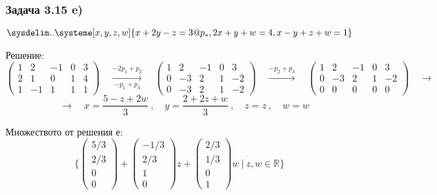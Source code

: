 \documentclass{subfiles}
\begin{document}
\subsubsection{Задача 3.15 e)}

\begin{equation*}
    \sysdelim..\systeme[x,y,z,w]{
        x + 2y - z = 3@p_{*},
        2x + y + w = 4,
        x - y + z + w = 1
    }
\end{equation*}

\noindent Решение:
\begin{equation*}
    \left(
        \begin{array}{ cccc|c }
            1 &  2 & -1 & 0 & 3 \\
            2 &  1 &  0 & 1 & 4 \\
            1 & -1 &  1 & 1 & 1
        \end{array}
    \right)
    \quad
    \overset{-2p_{1}+p_{2}}{\underset{-p_{1}+p_{3}}{\longrightarrow}}
    \quad
    \left(
        \begin{array}{ cccc|c }
            1 &  2 & -1 & 0 & 3 \\
            0 & -3 &  2 & 1 & -2 \\
            0 & -3 &  2 & 1 & -2
        \end{array}
    \right)
    \quad
    \overset{-p_{2}+p_{3}}{\longrightarrow}
    \quad
    \left(
        \begin{array}{ cccc|c }
            1 &  2 & -1 & 0 & 3 \\
            0 & -3 &  2 & 1 & -2 \\
            0 &  0 &  0 & 0 & 0
        \end{array}
    \right)
    \quad
    \longrightarrow
    \quad
\end{equation*}
\begin{equation*}
    \quad
    \longrightarrow
    \quad
    x = \frac{5 - z + 2w}{3}\ ,\quad
    y = \frac{2 + 2z + w}{3}\ ,\quad
    z = z\ ,\quad
    w = w
\end{equation*}

\noindent Множеството от решения е:
\begin{equation*}
    \{
        \left(\begin{array}{ c } 5/3 \\ 2/3 \\ 0 \\ 0 \end{array}\right) +
        \left(\begin{array}{ c } -1/3 \\ 2/3 \\ 1 \\ 0 \end{array}\right) z +
        \left(\begin{array}{ c } 2/3 \\ 1/3 \\ 0 \\ 1 \end{array}\right) w
        \ |\ z, w \in \mathbb{R}
    \}
\end{equation*}
\end{document}
